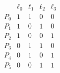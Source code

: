 $$
\begin{array}{c|cccc}
& \ell_0 & \ell_1 & \ell_2 & \ell_3 \\
\hline
P_0 & 1 & 1 & 0 & 0 \\
P_1 & 1 & 0 & 1 & 0 \\
P_2 & 1 & 0 & 0 & 1 \\
P_3 & 0 & 1 & 1 & 0 \\
P_4 & 0 & 1 & 0 & 1 \\
P_5 & 0 & 0 & 1 & 1 \\
\end{array}
$$
